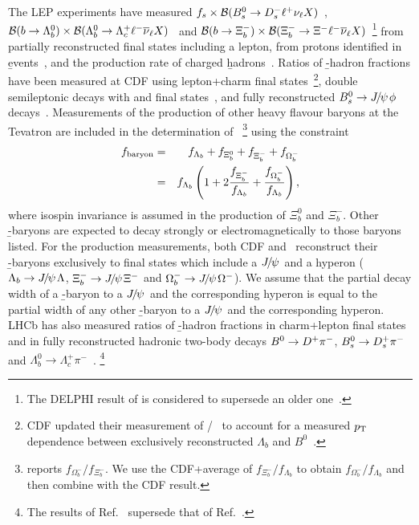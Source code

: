 The LEP experiments have measured
$f_{s} \times {\cal B}(B^0_s\to D_s^- \ell^+ \nu_\ell \mbox{$X$})$~\cite{Abreu:1992rv,*Acton:1992zq,*Buskulic:1995bd}, 
$\BR{\b\to\Lb} \times \BR{\Lb\to\Lc\ell^-\bar{\nu}_\ell \mbox{$X$}}$~\cite{Abreu:1995me,Barate:1997if}
and ${\cal B}(b\to\Xi_b^-) \times {\cal B}(\Xi_b^- \to \Xi^-\ell^-\overline\nu_\ell 
\mbox{$X$})$~\cite{Buskulic:1996sm,Abdallah:2005cw}\footnote{
  \label{foot:life_mix:Abdallah:2005cw}
  The DELPHI result of  is considered to supersede an older one~\cite{Abreu:1995kt}.
} 
from partially reconstructed final states including a lepton, \fbb
from protons identified in \b events~\cite{Barate:1997ty}, and the 
production rate of charged \b hadrons~\cite{Abdallah:2003xp}. 
Ratios of \b-hadron fractions have been measured at CDF using 
lepton+charm final 
states~\cite{Affolder:1999iq,Aaltonen:2008zd,Aaltonen:2008eu}\footnote{
  \label{foot:life_mix:Affolder:1999iq}
  CDF updated their measurement of \fLb/\fBd~\cite{Affolder:1999iq} to account 
  for a measured $p_{\rm T}$ dependence between exclusively reconstructed 
  $\Lambda_b$ and $B^0$~\cite{Aaltonen:2008eu}.
}, double semileptonic decays 
with  and \particle{\phi\mu\mu}
final states~\cite{Abe:1999ta},
and fully reconstructed $B^0_s\to{J\mskip -3mu/\mskip -2mu\psi\mskip 2mu}\phi$ decays~\cite{CDFnote10795:2012}.
Measurements of the production of other heavy 
flavour baryons at the Tevatron are included in the determination of 
\fbb~\cite{Abazov_mod:2007ub,Abazov:2008qm,Aaltonen:2009ny}\footnote{
  \label{foot:life_mix:Abazov:2008qm}
  \dzero reports $f_{\Omega_b^-}/f_{\Xi_b^-}$.  We use the CDF+\dzero average of 
  $f_{\Xi_b^-}/f_{\Lambda_b}$ to obtain $f_{\Omega_b^-}/f_{\Lambda_b}$ and then 
  combine with the CDF result.
} using the constraint
\begin{eqnarray}
f_{\rm baryon} & = & f_{\Lambda_b} + f_{\Xi_b^0} + f_{\Xi_b^-} + f_{\Omega_b^-} 
     \nonumber \\
     & = & f_{\Lambda_b}\left(1 + 2\frac{f_{\Xi_b^-}}{f_{\Lambda_b}} 
           + \frac{f_{\Omega_b^-}}{f_{\Lambda_b}}\right),
\end{eqnarray}
where isospin invariance is assumed in the production of $\Xi_b^0$ and 
$\Xi_b^-$. Other \b-baryons are expected to decay strongly or 
electromagnetically to those baryons listed. For the production 
measurements, both CDF and \dzero\ reconstruct their \b-baryons exclusively 
to final states which include a ${J\mskip -3mu/\mskip -2mu\psi\mskip 2mu}$ and a hyperon 
($\Lambda_b\rightarrow {J\mskip -3mu/\mskip -2mu\psi\mskip 2mu} \Lambda$, 
$\Xi_b^- \rightarrow {J\mskip -3mu/\mskip -2mu\psi\mskip 2mu} \Xi^-$ and 
$\Omega_b^- \rightarrow {J\mskip -3mu/\mskip -2mu\psi\mskip 2mu} \Omega^-$).  
We assume that the partial decay width of a \b-baryon to a ${J\mskip -3mu/\mskip -2mu\psi\mskip 2mu}$ and the 
corresponding hyperon is equal to the partial width of any other \b-baryon to 
a ${J\mskip -3mu/\mskip -2mu\psi\mskip 2mu}$ and the corresponding hyperon.  LHCb has also measured
ratios of \b-hadron fractions in charm+lepton final states~\cite{Aaij:2011jp} 
and in fully reconstructed hadronic two-body decays $B^0 \to D^+\pi^-$, $B^0_s \to D^+_s \pi^-$ and 
$\Lambda_b^0 \to \Lambda_c^+ \pi^-$~\cite{Aaij:2013qqa,Aaij:2014jyk}.%
\footnote{
\label{foot:life_mix:Aaij:2013qqa}
The results of Ref.~\cite{Aaij:2013qqa} supersede that of Ref.~\cite{Aaij:2011hi}.
}

